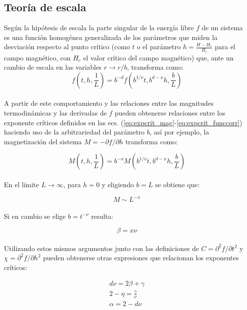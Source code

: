 \subsection{Teoría de escala}
\label{sec:teoria_escala}
Según la hipótesis de escala \cite{fisher_scaling} la parte singular de la energía libre $f$ de un sistema es una función homogénea generalizada de los
 parámetros que miden la desviación respecto al punto crítico (como $t$ o el parámetro $h=\frac{H-H_{c}}{H_{c}}$ para el campo magnético, con $H_{c}$ el valor crítico del campo magnético)
 que, ante un cambio de escala en las variables $r\rightarrow r/b$, transforma como:
\begin{equation}
	\label{eq:sca_hyp}
	f(t,h,\frac{1}{L})=b^{-d}f(b^{1/\nu}t,b^{d-x}h,\frac{b}{L})
\end{equation}
\\

A partir de este comportamiento y las relaciones entre las magnitudes termodinámicas y las derivadas de $f$ pueden obtenerse relaciones entre los exponente críticos
 definidos en las ecs. (\ref{eq:expcrit_mag}-\ref{eq:expcrit_funccorr}) haciendo uso de la arbitrariedad del parámetro $b$, así por ejemplo, la magnetización del
 sistema $M=-\partial f/\partial h$ transforma como:

\begin{equation}
	\label{eq:sca_mag}
	M(t,h,\frac{1}{L})=b^{-x}M(b^{1/\nu}t,b^{d-x}h,\frac{b}{L})
\end{equation}
\\
En el límite $L\rightarrow \infty$, para $h=0$ y eligiendo $b=L$ se obtiene que:

\begin{equation}
	\label{eq:xdefinition}
	M\sim L^{-x}
\end{equation}
\\
Si en cambio se elige $b=t^{-\nu}$ resulta:

\begin{equation}
	\label{eq:sca_rel_1}
	\beta =x\nu
\end{equation}
\\
Utilizando estos mismos argumentos junto con las definiciones de $C=\partial^{2} f/\partial t^{2}$ y $\chi=\partial^{2} f/\partial h^{2}$
 pueden obtenerse otras expresiones que relacionan los exponentes críticos:

\begin{center} 
\begin{eqnarray}
	\label{eq:sca_rel_2}
	d\nu =2\beta +\gamma \\
	\label{eq:sca_rel_3}
	2-\eta =\frac{\gamma}{\nu} \\
	\label{eq:sca_rel_4}
	\alpha = 2 - d\nu
\end{eqnarray}
\end{center}

